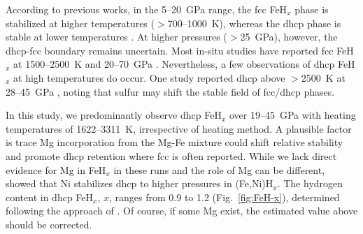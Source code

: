 \documentclass[draft,jgrga,12pt]{agujournal2019}
\begin{document}
According to previous works, in the 5--20~GPa range, the fcc FeH$_x$ phase is stabilized at higher temperatures ($>$700--1000~K), whereas the dhcp phase is stable at lower temperatures \cite{sakamaki_melting_2009,narygina_xray_2011}. 
At higher pressures ($>$25~GPa), however, the dhcp-fcc boundary remains uncertain.
Most in-situ studies have reported fcc FeH$_x$ at 1500--2500~K and 20--70~{GPa} \cite{piet_effect_2021,thompson_highpressure_2018,narygina_xray_2011}. 
Nevertheless, a few observations of dhcp FeH$_x$ at high temperatures do occur. 
One study reported dhcp above $>$2500~K at 28--45~{GPa} \cite{piet_effects_2021}, noting that sulfur may shift the stable field of fcc/dhcp phases. 

In this study, we predominantly observe dhcp FeH$_x$ over 19--45~{GPa} with heating temperatures of 1622--3311~K, irrespective of heating method. 
A plausible factor is trace Mg incorporation from the Mg-Fe mixture could shift relative stability and promote dhcp retention where fcc is often reported. 
While we lack direct evidence for Mg in FeH$_x$ in these runs and the role of Mg can be different,  showed that Ni stabilizes dhcp to higher pressures in (Fe,Ni)H$_x$.
The hydrogen content in dhcp FeH$_x$, $x$, ranges from 0.9 to 1.2 (Fig.~\ref{fig:FeH-x}), determined following the approach of .
Of course, if some Mg exist, the estimated value above should be corrected.


\end{document}

